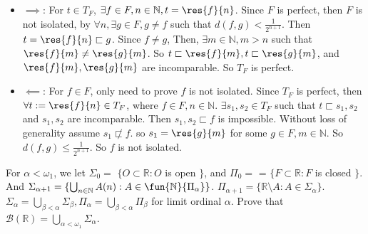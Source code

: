 \documentclass{ctexart}
\begin{document}
\begin{solution}
  \begin{itemize}
    \item \(\implies\): For \(t \in T_F\), \(\exists f \in F,n \in \mathbb{N},t =\res{f}{n}\).
      Since \(F\) is perfect, then \(F\) is not isolated,
      by  \(\forall n, \exists g \in F, g \neq f\) such that 
      \(d(f,g)<\frac{1}{2^{n+1}}\). 
      Then \(t =\res{f}{n} \sqsubset g\).
      Since \(f \neq g\), Then, \(\exists m \in \mathbb{N} , m >n\) such that 
      \(\res{f}{m}\neq \res{g}{m}\). 
      So \(t \sqsubset \res{f}{m},t \sqsubset \res{g}{m}\), and \(\res{f}{m},\res{g}{m}\) are incomparable. 
      So \(T_F\) is perfect.
    \item \(\impliedby\): For \(f \in F\), only need to prove \(f\) is not isolated.
      Since \(T_F\) is perfect, then \(\forall t:=\res{f}{n} \in T_F\), where \(f \in F, n \in \mathbb{N}\).
       \(\exists s_1,s_2 \in T_F\) such that \(t \sqsubset s_1,s_2\) and \(s_1,s_2\) are incomparable. 
      Then \(s_1,s_2 \sqsubset f\) is impossible. 
      Without loss of generality assume \(s_1 \not \sqsubset f\). 
      so \(s_1=\res{g}{m}\) for some \(g \in F,m \in \mathbb{N}\). 
      So \(d(f,g) \leq \frac{1}{2^{n + 1}}\). So \(f\) is not isolated. 
  \end{itemize}
\end{solution}

\begin{problem}
  For \(\alpha <\omega_1\), we let \(\Sigma_0=\)  \(\{O \subset\mathbb{R}: O\) is open \(\}\), 
  and \(\Pi_0=\) = \(\{F \subset\mathbb{R}: F \) is closed \(\}\). 
  And \(\Sigma_{\alpha+1}=\{\bigcup_{n \in \mathbb{N}} A(n):A \in \fun{\mathbb{N}}{\Pi_{\alpha}}\}\). 
  \(\Pi_{\alpha+1}=\{\mathbb{R}\setminus A:A \in \Sigma_{\alpha}\}\). 
  \(\Sigma_{\alpha}=\bigcup_{\beta<\alpha} \Sigma_{\beta},\Pi_{\alpha}=\bigcup_{\beta<\alpha} \Pi _{\beta}\) for limit ordinal \(\alpha\). 
  Prove that \(\mathcal{B}(\mathbb{R})=\bigcup_{\alpha<\omega_1} \Sigma_{\alpha}\). 
\end{problem}
\end{document}
